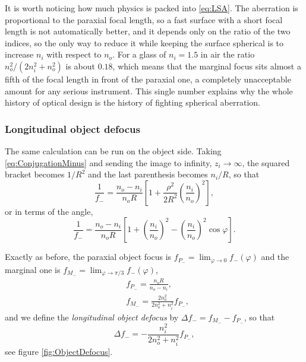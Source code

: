                 It is worth noticing how much physics is packed into \ref{eq:LSA}. The aberration is proportional to the paraxial focal length, so a fast surface with a short focal length is not automatically better, and it depends only on the ratio of the two indices, so the only way to reduce it while keeping the surface spherical is to increase $n_i$ with respect to $n_o$. For a glass of $n_i=1.5$ in air the ratio $n_o^2/(2n_i^2+n_o^2)$ is about $0.18$, which means that the marginal focus sits almost a fifth of the focal length in front of the paraxial one, a completely unacceptable amount for any serious instrument. This single number explains why the whole history of optical design is the history of fighting spherical aberration.

                \subsubsection{Longitudinal object defocus}

                    The same calculation can be run on the object side. Taking \ref{eq:ConjugationMinus} and sending the image to infinity, $z_i\to\infty$, the squared bracket becomes $1/R^2$ and the last parenthesis becomes $n_i/R$, so that
                    \begin{equation}\label{eq:ObjectDefocusEq}
                        \frac{1}{f_-} = \frac{n_o-n_i}{n_oR}\left[ 1 + \frac{\rho^2}{2R^2}\left( \frac{n_i}{n_o} \right)^2 \right],
                    \end{equation}
                    or in terms of the angle,
                    \begin{equation}\label{eq:ObjectDefocusPhi}
                        \frac{1}{f_-} = \frac{n_o-n_i}{n_oR}\left[ 1 + \left( \frac{n_i}{n_o} \right)^2 - \left( \frac{n_i}{n_o} \right)^2\cos\varphi \right].
                    \end{equation}

                    Exactly as before, the paraxial object focus is $f_{P_-} = \lim_{\varphi\to0}f_-(\varphi)$ and the marginal one is $f_{M_-} = \lim_{\varphi\to\pi/3}f_-(\varphi)$,
                    \begin{align}
                        & f_{P_-} = \frac{n_oR}{n_o-n_i},\label{eq:ParaxialFocalMinus}\\
                        & f_{M_-} = \frac{2n_o^2}{2n_o^2+n_i^2}f_{P_-},\label{eq:MarginalFocalMinus}
                    \end{align}
                    and we define the \emph{longitudinal object defocus} by $\Delta f_- = f_{M_-} - f_{P_-}$, so that
                    \begin{equation}\label{eq:ObjectDefocusValue}
                        \Delta f_- = -\frac{n_i^2}{2n_o^2+n_i^2}f_{P_-},
                    \end{equation}
                    see figure \ref{fig:ObjectDefocus}.


